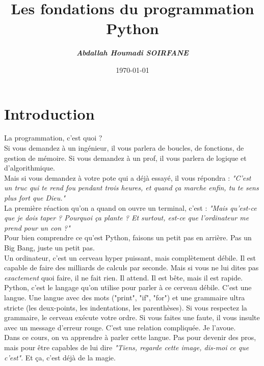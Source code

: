 \documentclass[12pt,a4paper]{article}
\title{Les fondations du programmation Python}
\author{\textbf{\textit{Abdallah Houmadi SOIRFANE}}}
\date{\today}
\begin{document}
	  \maketitle
	
		\thispagestyle{empty}%
	     

	    \section{Introduction}
	
	   La programmation, c'est quoi ?\\[0.2cm]
	   Si vous demandez à un ingénieur, il vous parlera de boucles, de fonctions, de gestion de mémoire. Si vous demandez à un prof, il vous parlera de logique et d'algorithmique.\\[0.2cm]
	   Mais si vous demandez à votre pote qui a déjà essayé, il vous répondra : \textit{"C'est un truc qui te rend fou pendant trois heures, et quand ça marche enfin, tu te sens plus fort que Dieu."}\\[0.2cm]
	   
	   La première réaction qu'on a quand on ouvre un terminal, c'est : \textit{"Mais qu'est-ce que je dois taper ? Pourquoi ça plante ? Et surtout, est-ce que l'ordinateur me prend pour un con ?"}\\[0.2cm]
	   
	   Pour bien comprendre ce qu'est Python, faisons un petit pas en arrière. Pas un Big Bang, juste un petit pas.\\[0.2cm]
	   
	   Un ordinateur, c'est un cerveau hyper puissant, mais complètement débile. Il est capable de faire des milliards de calculs par seconde. Mais si vous ne lui dites pas \textit{exactement} quoi faire, il ne fait rien. Il attend. Il est bête, mais il est rapide.\\[0.2cm]
	   
	   Python, c'est le langage qu'on utilise pour parler à ce cerveau débile. C'est une langue. Une langue avec des mots ("print", "if", "for") et une grammaire ultra stricte (les deux-points, les indentations, les parenthèses). Si vous respectez la grammaire, le cerveau exécute votre ordre. Si vous faites une faute, il vous insulte avec un message d'erreur rouge. C'est une relation compliquée. Je l'avoue.\\[0.2cm]
	   
	   Dans ce cours, on va apprendre à parler cette langue. Pas pour devenir des pros, mais pour être capables de lui dire \textit{"Tiens, regarde cette image, dis-moi ce que c'est"}. Et ça, c'est déjà de la magie.
\end{document}
